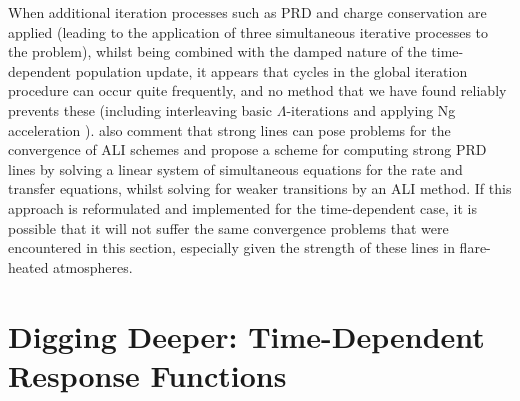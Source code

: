 When additional iteration processes such as PRD and charge conservation are applied (leading to the application of three simultaneous iterative processes to the problem), whilst being combined with the damped nature of the time-dependent population update, it appears that cycles in the global iteration procedure can occur quite frequently, and no method that we have found reliably prevents these (including interleaving basic $\Lambda$-iterations and applying Ng acceleration \citep{Ng1974}).
\citet{Avrett2008} also comment that strong lines can pose problems for the convergence of ALI schemes and propose a scheme for computing strong PRD lines by solving a linear system of simultaneous equations for the rate and transfer equations, whilst solving for weaker transitions by an ALI method.
If this approach is reformulated and implemented for the time-dependent case, it is possible that it will not suffer the same convergence problems that were encountered in this section, especially given the strength of these lines in flare-heated atmospheres.

\section{Digging Deeper: Time-Dependent Response Functions}

